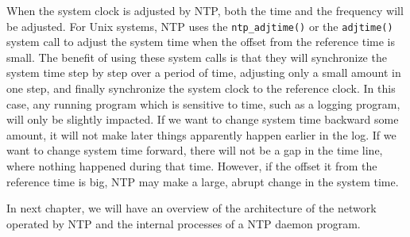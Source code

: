 When the system clock is adjusted by NTP\null, both the time and the frequency
will be adjusted. For Unix systems, NTP uses the \verb|ntp_adjtime()| or
the \verb|adjtime()| system call to adjust the system time when the offset from
the reference time is small.
The benefit of using these system calls is that they will synchronize the
system time step by
step over a period of time, adjusting only a small amount in one step, and finally
synchronize the system clock to the reference clock. In this case, any running
program which is sensitive to
time, such as a logging program, will only be slightly impacted. If we want to
change system time backward some amount, it will not make later things
apparently happen earlier in the log. If we want to change system time forward,
there will not be a gap in the time line, where nothing happened during that
time. However, if the offset it from the reference time is big, NTP may make a
large, abrupt change in the system time.

In next chapter, we will have an overview of the architecture of the network
operated by NTP and the internal processes of a NTP daemon program.




